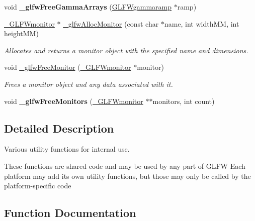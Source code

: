 \begin{DoxyCompactItemize}
\item 
\hypertarget{group__utility_ga9ec7f45d75c8b6435f49b22b86672806}{}void {\bfseries \+\_\+glfw\+Free\+Gamma\+Arrays} (\hyperlink{structGLFWgammaramp}{G\+L\+F\+Wgammaramp} $\ast$ramp)\label{group__utility_ga9ec7f45d75c8b6435f49b22b86672806}

\item 
\hyperlink{struct__GLFWmonitor}{\+\_\+\+G\+L\+F\+Wmonitor} $\ast$ \hyperlink{group__utility_gaba9010067229bd447389b85b22f15b72}{\+\_\+glfw\+Alloc\+Monitor} (const char $\ast$name, int width\+M\+M, int height\+M\+M)
\begin{DoxyCompactList}\small\item\em Allocates and returns a monitor object with the specified name and dimensions. \end{DoxyCompactList}\item 
\hypertarget{group__utility_ga5555e8488ac56b446d0a28d3330666f6}{}void \hyperlink{group__utility_ga5555e8488ac56b446d0a28d3330666f6}{\+\_\+glfw\+Free\+Monitor} (\hyperlink{struct__GLFWmonitor}{\+\_\+\+G\+L\+F\+Wmonitor} $\ast$monitor)\label{group__utility_ga5555e8488ac56b446d0a28d3330666f6}

\begin{DoxyCompactList}\small\item\em Frees a monitor object and any data associated with it. \end{DoxyCompactList}\item 
\hypertarget{group__utility_gad6806b60be458b9363d2f4f92083a18e}{}void {\bfseries \+\_\+glfw\+Free\+Monitors} (\hyperlink{struct__GLFWmonitor}{\+\_\+\+G\+L\+F\+Wmonitor} $\ast$$\ast$monitors, int count)\label{group__utility_gad6806b60be458b9363d2f4f92083a18e}

\end{DoxyCompactItemize}


\subsection{Detailed Description}
Various utility functions for internal use. 

These functions are shared code and may be used by any part of G\+L\+F\+W Each platform may add its own utility functions, but those may only be called by the platform-\/specific code 

\subsection{Function Documentation}
\hypertarget{group__utility_gaba9010067229bd447389b85b22f15b72}{}
